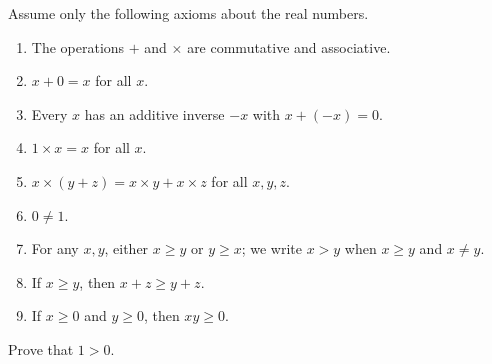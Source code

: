 Assume only the following axioms about the real numbers.
\begin{enumerate}
\item The operations $+$ and $\times$ are commutative and associative.
\item $x+0=x$ for all $x$.
\item Every $x$ has an additive inverse $-x$ with $x+(-x)=0$.
\item $1\times x=x$ for all $x$.
\item $x\times(y+z)=x\times y+x\times z$ for all $x,y,z$.
\item $0\ne1$.
\item For any $x,y$, either $x\ge y$ or $y\ge x$; we write $x>y$ when $x\ge y$ and $x\ne y$.
\item If $x\ge y$, then $x+z\ge y+z$.
\item If $x\ge0$ and $y\ge0$, then $xy\ge0$.
\end{enumerate}
Prove that $1>0$.
